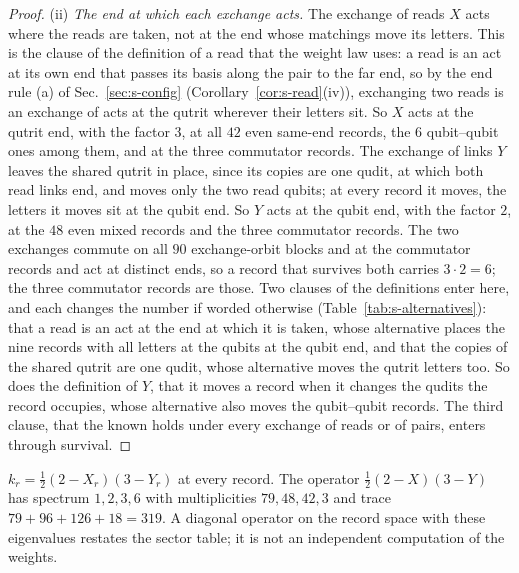 \begin{proof}
(ii) \emph{The end at which each exchange acts.} The exchange of reads $X$ acts where the reads are taken, not at the end whose matchings move its letters. This is the clause of the definition of a read that the weight law uses: a read is an act at its own end that passes its basis along the pair to the far end, so by the end rule (a) of Sec.~\ref{sec:s-config} (Corollary~\ref{cor:s-read}(iv)), exchanging two reads is an exchange of acts at the qutrit wherever their letters sit. So $X$ acts at the qutrit end, with the factor $3$, at all $42$ even same-end records, the $6$ qubit--qubit ones among them, and at the three commutator records. The exchange of links $Y$ leaves the shared qutrit in place, since its copies are one qudit, at which both read links end, and moves only the two read qubits; at every record it moves, the letters it moves sit at the qubit end. So $Y$ acts at the qubit end, with the factor $2$, at the $48$ even mixed records and the three commutator records. The two exchanges commute on all $90$ exchange-orbit blocks and at the commutator records and act at distinct ends, so a record that survives both carries $3\cdot 2=6$; the three commutator records are those. Two clauses of the definitions enter here, and each changes the number if worded otherwise (Table~\ref{tab:s-alternatives}): that a read is an act at the end at which it is taken, whose alternative places the nine records with all letters at the qubits at the qubit end, and that the copies of the shared qutrit are one qudit, whose alternative moves the qutrit letters too. So does the definition of $Y$, that it moves a record when it changes the qudits the record occupies, whose alternative also moves the qubit--qubit records. The third clause, that the known holds under every exchange of reads or of pairs, enters through survival.
\end{proof}

\begin{corollary}
\label{cor:s-gram}
$k_{r}=\tfrac{1}{2}(2-X_{r})(3-Y_{r})$ at every record. The operator $\tfrac{1}{2}(2-X)(3-Y)$ has spectrum $1,2,3,6$ with multiplicities $79,48,42,3$ and trace $79+96+126+18=319$. A diagonal operator on the record space with these eigenvalues restates the sector table; it is not an independent computation of the weights.
\end{corollary}

